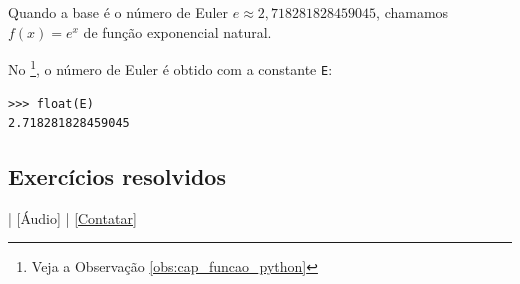 \begin{obs}
  Quando a base é o número de Euler $e \approx 2,718281828459045$, chamamos $f(x) = e^x$ de função exponencial natural.

  \ifispython
  No \sympy\footnote{Veja a Observação \ref{obs:cap_funcao_python}}, o número de Euler é obtido com a constante \verb+E+:
\begin{verbatim}
>>> float(E)
2.718281828459045
\end{verbatim}
  \fi
\end{obs}

\subsection*{Exercícios resolvidos}

\begin{flushright}
  [Vídeo] | [Áudio] | \href{https://phkonzen.github.io/notas/contato.html}{[Contatar]}
\end{flushright}

